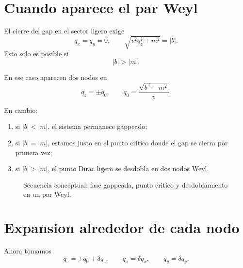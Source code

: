 \section{Cuando aparece el par Weyl}
El cierre del gap en el sector ligero exige
\begin{equation}
q_x=q_y=0,
\qquad
\sqrt{v^2 q_z^2+m^2}=|b|.
\end{equation}
Esto solo es posible si
\begin{equation}
|b|>|m|.
\label{c12:eq:splitcondition}
\end{equation}

En ese caso aparecen dos nodos en
\begin{equation}
q_z=\pm q_0,
\qquad
q_0=\frac{\sqrt{b^2-m^2}}{v}.
\label{c12:eq:q0}
\end{equation}

En cambio:
\begin{enumerate}[label=\arabic*.]
    \item si \(|b|<|m|\), el sistema permanece gappeado;
    \item si \(|b|=|m|\), estamos justo en el punto critico donde el gap se cierra por primera vez;
    \item si \(|b|>|m|\), el punto Dirac ligero se desdobla en dos nodos Weyl.
\end{enumerate}

\begin{figure}[h!]
\centering
{}
\caption{Secuencia conceptual: fase gappeada, punto critico y desdoblamiento en un par Weyl.}
\end{figure}

\section{Expansion alrededor de cada nodo}
Ahora tomamos
\begin{equation}
q_z = \pm q_0 + \delta q_z,
\qquad
q_x=\delta q_x,
\qquad
q_y=\delta q_y.
\end{equation}

